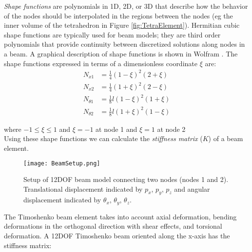 {\textit{Shape functions} are polynomials in 1D, 2D, or 3D that describe how the behavior of the nodes should be interpolated in the regions between the nodes (eg the inner volume of the tetrahedron in Figure \ref{fig:TetraElement}).  Hermitian cubic shape functions are typically used for beam models; they are third order polynomials that provide continuity between discretized solutions along nodes in a beam.  A graphical description of shape functions is shown in Wolfram \cite{Wolfram2016}.  The shape functions expressed in terms of a dimensionless coordinate $\xi$ are:
\begin{align*} 
N_{x1} &= \textstyle\frac{1}{4}(1-\xi)^2(2+\xi)\\
N_{x2} &= \textstyle\frac{1}{4}(1+\xi)^2(2-\xi)\\
N_{\theta1} &= \textstyle\frac{1}{8}l(1-\xi)^2(1+\xi)\\
N_{\theta2} &= \textstyle\frac{1}{8}l(1+\xi)^2(1-\xi)
\end{align*}

where $-1 \leq \xi \leq 1$ and $\xi = -1$ at node 1 and $\xi = 1$ at node 2\\

Using these shape functions we can calculate the \textit{stiffness matrix} ($K$) of a beam element.  


\begin{figure}
  \texttt{[image: BeamSetup.png]}
  \caption{Setup of 12DOF beam model connecting two nodes (nodes 1 and 2).  Translational displacement indicated by $p_x$, $p_y$, $p_z$ and angular displacement indicated by $\theta_x$, $\theta_y$, $\theta_z$.}
  \label{fig:BeamSetup}
\end{figure}

The Timoshenko beam element takes into account axial deformation, bending deformations in the orthogonal direction with shear effects, and torsional deformation.  A 12DOF Timoshenko beam oriented along the x-axis has the stiffness matrix:\\

}
